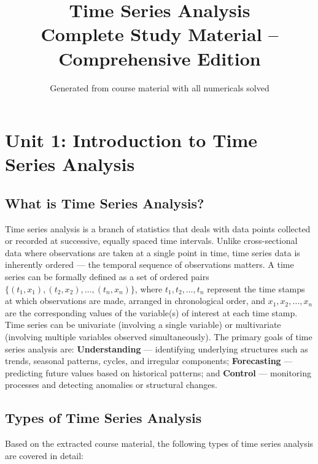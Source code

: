 \documentclass[11pt,a4paper]{article}
\title{\textbf{Time Series Analysis\\Complete Study Material -- Comprehensive Edition}}
\author{Generated from course material with all numericals solved}
\date{}
\begin{document}
\maketitle
\tableofcontents
\newpage


\section{Unit 1: Introduction to Time Series Analysis}

\subsection{What is Time Series Analysis?}

Time series analysis is a branch of statistics that deals with data points collected or recorded at successive, equally spaced time intervals. Unlike cross-sectional data where observations are taken at a single point in time, time series data is inherently ordered --- the temporal sequence of observations matters. A time series can be formally defined as a set of ordered pairs $\{(t_1, x_1), (t_2, x_2), \ldots, (t_n, x_n)\}$, where $t_1, t_2, \ldots, t_n$ represent the time stamps at which observations are made, arranged in chronological order, and $x_1, x_2, \ldots, x_n$ are the corresponding values of the variable(s) of interest at each time stamp. Time series can be univariate (involving a single variable) or multivariate (involving multiple variables observed simultaneously). The primary goals of time series analysis are: \textbf{Understanding} --- identifying underlying structures such as trends, seasonal patterns, cycles, and irregular components; \textbf{Forecasting} --- predicting future values based on historical patterns; and \textbf{Control} --- monitoring processes and detecting anomalies or structural changes.

\subsection{Types of Time Series Analysis}

Based on the extracted course material, the following types of time series analysis are covered in detail:
\end{document}
